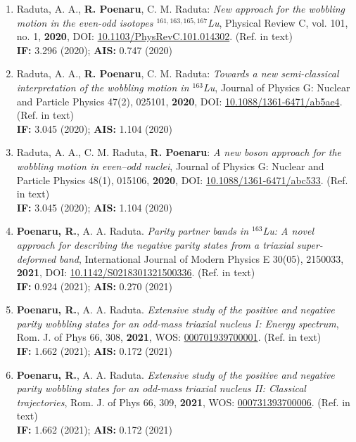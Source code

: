\begin{enumerate}
    \item Raduta, A. A., \textbf{R. Poenaru}, C. M. Raduta: \emph{New approach for the wobbling motion in the even-odd isotopes $^{161,163,165,167}$Lu}, Physical Review C, vol. 101, no. 1, \textbf{2020}, DOI: \href{https://link.aps.org/doi/10.1103/PhysRevC.101.014302}{10.1103/PhysRevC.101.014302}. (Ref. \cite{raduta2020approach} in text) \\
    \textbf{IF:} 3.296 (2020); \textbf{AIS:} 0.747 (2020)
    \item Raduta, A. A., \textbf{R. Poenaru}, C. M. Raduta: \emph{Towards a new semi-classical interpretation of the wobbling motion in $^{163}$Lu}, Journal of Physics G: Nuclear and Particle Physics 47(2), 025101, \textbf{2020}, DOI: \href{https://iopscience.iop.org/article/10.1088/1361-6471/ab5ae4/meta}{10.1088/1361-6471/ab5ae4}. (Ref. \cite{raduta2020towards} in text) \\
    \textbf{IF:} 3.045 (2020); \textbf{AIS:} 1.104 (2020)
    \item Raduta, A. A., C. M. Raduta, \textbf{R. Poenaru}: \emph{A new boson approach for the wobbling motion in even–odd nuclei}, Journal of Physics G: Nuclear and Particle Physics 48(1), 015106, \textbf{2020}, DOI: \href{https://iopscience.iop.org/article/10.1088/1361-6471/abc533/meta}{10.1088/1361-6471/abc533}. (Ref. \cite{raduta2020new} in text) \\
    \textbf{IF:} 3.045 (2020); \textbf{AIS:} 1.104 (2020)
    \item \textbf{Poenaru, R.}, A. A. Raduta. \emph{Parity partner bands in $^{163}$Lu: A novel approach for describing the negative parity states from a triaxial super-deformed band}, International Journal of Modern Physics E 30(05), 2150033, \textbf{2021}, DOI: \href{https://www.worldscientific.com/doi/abs/10.1142/S0218301321500336}{10.1142/S0218301321500336}. (Ref. \cite{poenaru2021parity} in text) \\
    \textbf{IF:} 0.924 (2021); \textbf{AIS:} 0.270 (2021)
    \item \textbf{Poenaru, R.}, A. A. Raduta. \emph{Extensive study of the positive and negative parity wobbling states for an odd-mass triaxial nucleus I: Energy spectrum}, Rom. J. of Phys 66, 308, \textbf{2021}, WOS: \href{https://rjp.nipne.ro/2021_66_7-8/RomJPhys.66.308.pdf}{000701939700001}. (Ref. \cite{poenaru2021extensive1} in text) \\
    \textbf{IF:} 1.662 (2021); \textbf{AIS:} 0.172 (2021)
    \item \textbf{Poenaru, R.}, A. A. Raduta. \emph{Extensive study of the positive and negative parity wobbling states for an odd-mass triaxial nucleus II: Classical trajectories}, Rom. J. of Phys 66, 309, \textbf{2021}, WOS: \href{https://rjp.nipne.ro/2021_66_9-10/RomJPhys.66.309.pdf}{000731393700006}. (Ref. \cite{poenaru2021extensive2} in text) \\
    \textbf{IF:} 1.662 (2021); \textbf{AIS:} 0.172 (2021)
\end{enumerate}

